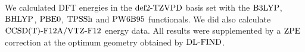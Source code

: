 \documentclass[8.5pt,twoside,twocolumn]{article}
\newcommand\zpe{\enmat{\te{ZPE}}}
\newcommand\dlfind{\enmat{\te{DL-FIND}}}
\theoremstyle{standard}
\begin{document}
We calculated DFT energies in the $\text{def2-TZVPD}$ basis set with
the $\text{B3LYP}$, $\text{BHLYP}$, $\text{PBE0}$, $\text{TPSSh}$ and $\text{PW6B95}$ 
functionals. We did also calculate $\text{CCSD(T)-F12A}/\text{VTZ-F}12$ energy data.
All results were supplemented by a $\zpe$ correction at the
optimum geometry obtained by $\dlfind$. 



\end{document}
